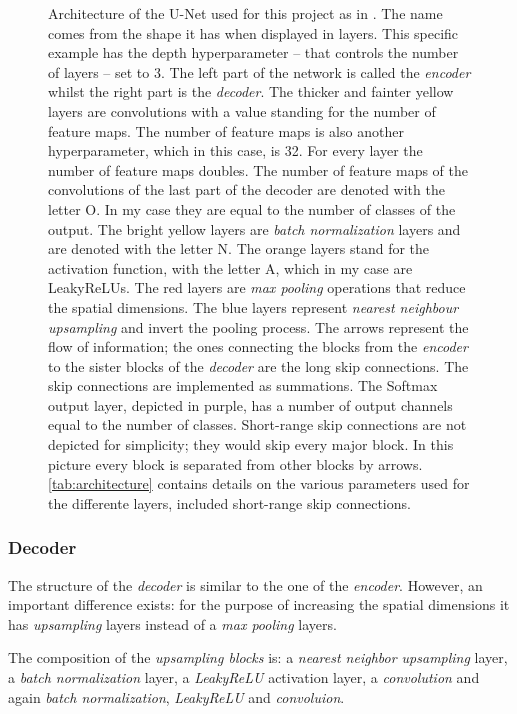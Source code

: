 \begin{figure}[h!]
    \centering
    
    \caption{Architecture of the U-Net used for this project as in \citep{Agrawal2019MachineImages}. The name comes from the shape it has when displayed in layers. This specific example has the depth hyperparameter -- that controls the number of layers -- set to 3. The left part of the network is called the \textit{encoder} whilst the right part is the \textit{decoder}. The thicker and fainter yellow layers are convolutions with a value standing for the number of feature maps. The number of feature maps is also another hyperparameter, which in this case, is 32. For every layer the number of feature maps doubles. The number of feature maps of the convolutions of the last part of the decoder are denoted with the letter O. In my case they are equal to the number of classes of the output. The bright yellow layers are \textit{batch normalization} layers and are denoted with the letter N. The orange layers stand for the activation function, with the letter A, which in my case are LeakyReLUs. The red layers are \textit{max pooling} operations that reduce the spatial dimensions. The blue layers represent \textit{nearest neighbour upsampling} and invert the pooling process. The arrows represent the flow of information; the ones connecting the blocks from the \textit{encoder} to the sister blocks of the \textit{decoder} are the long skip connections. The skip connections are implemented as summations. The Softmax output layer, depicted in purple, has a number of output channels equal to the number of classes. Short-range skip connections are not depicted for simplicity; they would skip every major block. In this picture every block is separated from other blocks by arrows. \cref{tab:architecture} contains details on the various parameters used for the differente layers, included short-range skip connections.}
    \protect\label{fig:unet}
\end{figure}

\subsubsection{Decoder}
The structure of the \textit{decoder} is similar to the one of the \textit{encoder}. However, an important difference exists: for the purpose of increasing the spatial dimensions it has \textit{upsampling} layers instead of a \textit{max pooling} layers. 

The composition of the \textit{upsampling blocks} is: a \textit{nearest neighbor upsampling} layer, a \textit{batch normalization} layer, a \textit{LeakyReLU} activation layer, a \textit{convolution} and again \textit{batch normalization}, \textit{LeakyReLU} and \textit{convoluion}.

